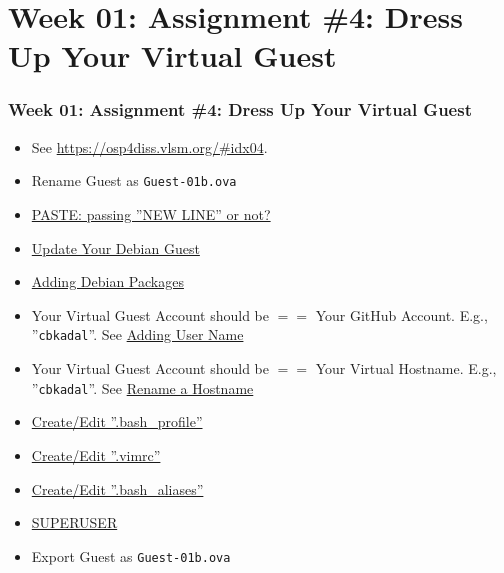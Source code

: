 \documentclass[xcolor=table, notheorems, hyperref={pdfpagelabels=false}]{beamer}
\begin{document}
\section{Week 01: Assignment \#4: Dress Up Your Virtual Guest}
\begin{frame}[fragile]
\frametitle{Week 01: Assignment \#4: Dress Up Your Virtual Guest}
\begin{itemize}
\item See \url{https://osp4diss.vlsm.org/\#idx04}.
\item Rename Guest as \texttt{Guest-01b.ova}
\item \href{https://osp4diss.vlsm.org/osp-116.html}{PASTE: passing ''NEW LINE'' or not?}
\item \href{https://osp4diss.vlsm.org/osp-102.html}{Update Your Debian Guest}
\item \href{https://osp4diss.vlsm.org/osp-103.html}{Adding Debian Packages}
\item Your Virtual Guest Account should be $==$ Your GitHub Account.
E.g., ''\texttt{cbkadal}''. See \href{https://osp4diss.vlsm.org/osp-104.html}{Adding User Name}
\item Your Virtual Guest Account should be $==$ Your Virtual Hostname.
E.g., ''\texttt{cbkadal}''. See \href{https://osp4diss.vlsm.org/osp-105.html}{Rename a Hostname}
\item \href{https://osp4diss.vlsm.org/osp-106.html}{Create/Edit ''.bash\_profile''}
\item \href{https://osp4diss.vlsm.org/osp-107.html}{Create/Edit ''.vimrc''}
\item \href{https://osp4diss.vlsm.org/osp-108.html}{Create/Edit ''.bash\_aliases''}
\item \href{https://osp4diss.vlsm.org/osp-109.html}{SUPERUSER}
\item Export Guest as \texttt{Guest-01b.ova}
\end{itemize}
\end{frame}


\end{document}
